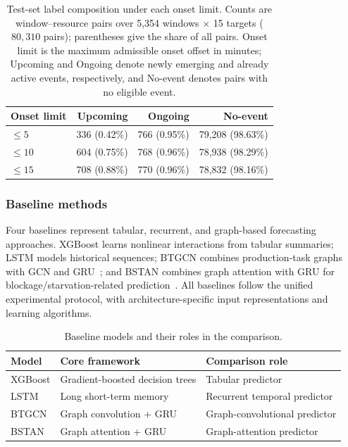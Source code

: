 \documentclass[a4paper,fleqn]{cas-dc}
\begin{document}
\begin{table}[pos=!htbp]
\centering
\caption{Test-set label composition under each onset limit. Counts are window--resource pairs over 5,354 windows $\times$ 15 targets ($80{,}310$ pairs); parentheses give the share of all pairs. Onset limit is the maximum admissible onset offset in minutes; Upcoming and Ongoing denote newly emerging and already active events, respectively, and No-event denotes pairs with no eligible event.}
\label{tab:dataset-labels}
\scriptsize
\setlength{\tabcolsep}{3.2pt}
\renewcommand{\arraystretch}{1.08}
\begin{tabular*}{\columnwidth}{@{\extracolsep{\fill}}lrrr@{}}
\toprule
Onset limit & Upcoming & Ongoing & No-event \\
\midrule
$\leq5$ & 336 (0.42\%) & 766 (0.95\%) & 79,208 (98.63\%) \\
$\leq10$ & 604 (0.75\%) & 768 (0.96\%) & 78,938 (98.29\%) \\
$\leq15$ & 708 (0.88\%) & 770 (0.96\%) & 78,832 (98.16\%) \\
\bottomrule
\end{tabular*}
\end{table}

\subsubsection{Baseline methods}

Four baselines represent tabular, recurrent, and graph-based forecasting approaches. XGBoost learns nonlinear interactions from tabular summaries; LSTM models historical sequences; BTGCN combines production-task graphs with GCN and GRU~\cite{yin2025btgcn}; and BSTAN combines graph attention with GRU for blockage/starvation-related prediction~\cite{lai2023bstan}. All baselines follow the unified experimental protocol, with architecture-specific input representations and learning algorithms.

\begin{table}[pos=!htbp]
\centering
\caption{Baseline models and their roles in the comparison.}
\label{tab:exp-baselines}
\scriptsize
\setlength{\tabcolsep}{4pt}
\renewcommand{\arraystretch}{1.10}
\begin{tabularx}{\columnwidth}{@{}lXX@{}}
\toprule
Model & Core framework & Comparison role \\
\midrule
XGBoost & Gradient-boosted decision trees & Tabular predictor \\
LSTM & Long short-term memory & Recurrent temporal predictor \\
BTGCN & Graph convolution + GRU & Graph-convolutional predictor \\
BSTAN & Graph attention + GRU & Graph-attention predictor \\
\bottomrule
\end{tabularx}
\end{table}
\end{document}
